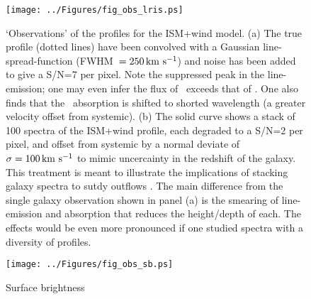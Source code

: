 \documentclass[12pt,preprint]{aastex}
\begin{document}
\begin{figure}
\texttt{[image: ../Figures/fig\_obs\_lris.ps]}
\caption{
`Observations' of the  profiles for the ISM+wind model.  
(a) The true profile (dotted lines) have been convolved with a
Gaussian line-spread-function (FWHM~$= 250 \, {\rm km~s^{-1}}$) and noise has been
added to give a S/N=7 per pixel.  Note the suppressed peak in the
line-emission; one may even infer the flux of \mgiia\ exceeds that of
\mgiia.  One also finds that the \mgiia\ absorption is shifted to
shorted wavelength (a greater velocity offset from systemic).  
(b) The solid curve shows a stack of 100 spectra of the ISM+wind
profile, each degraded to a S/N=2 per pixel, and offset from systemic
by a normal deviate of $\sigma = 100 \, {\rm km~s^{-1}}$ to mimic uncercainty in
the redshift of the galaxy.  
This treatment is meant to illustrate the
implications of stacking galaxy spectra to sutdy outflows
\citep[e.g.][]{wcp+09,sato+,rkc+10}.   The main difference from the
single galaxy observation shown in panel (a) is the smearing of
line-emission and absorption that reduces the height/depth of each.
The effects would be even more pronounced if one studied spectra with
a diversity of  profiles.    
}
\label{fig:obs_lris}
\end{figure}

\begin{figure}
\texttt{[image: ../Figures/fig\_obs\_sb.ps]}
\caption{
Surface brightness
}
\label{fig:obs_sb}
\end{figure}
\end{document}
